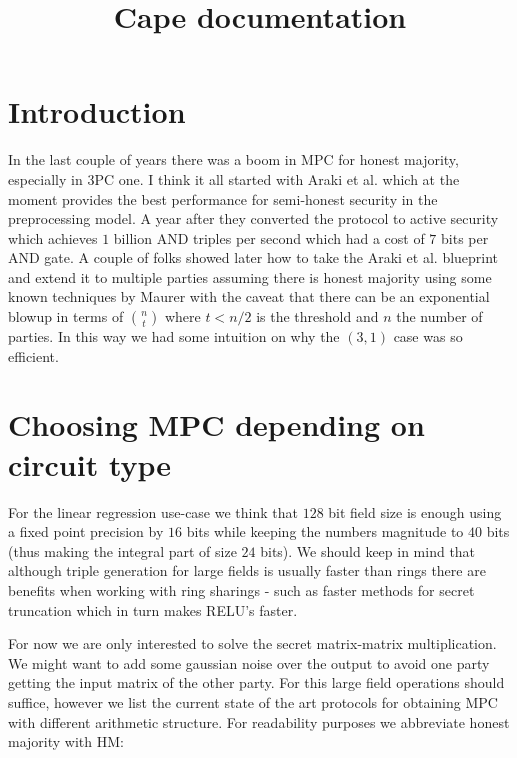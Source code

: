 \documentclass[11pt]{article}
\begin{document}
%

\title{Cape documentation}

\maketitle

\section{Introduction}


In the last couple of years there was a boom in MPC for honest majority,
especially in 3PC one. I think it all started with Araki et al.
\cite{CCS:AFLNO16} which at the moment provides the best performance for
semi-honest security in the preprocessing model. A year after they converted
the protocol to active security which achieves $1$ billion AND triples per
second \cite{SP:ABFLLN17} which had a cost of $7$ bits per AND gate. A couple
of folks showed later how to take the Araki et al. \cite{CCS:AFLNO16}
blueprint and extend it to multiple parties assuming there is honest majority
\cite{SCN:KRSW18} using some known techniques by Maurer \cite{SCN:Maurer02}
with the caveat that there can be an exponential blowup in terms of $n
\choose t$ where $t<n/2$ is the threshold and $n$ the number of parties. In
this way we had some intuition on why the $(3,1)$ case was so efficient.

\section{Choosing MPC depending on circuit type} For the linear regression use-case
we think that $128$ bit field size is enough using a fixed point precision by
$16$ bits while keeping the numbers magnitude to $40$ bits (thus making the
integral part of size $24$ bits). We should keep in mind that although triple
generation for large fields is usually faster than rings there are benefits
when working with ring sharings - such as faster methods for secret
truncation which in turn makes RELU's faster.

For now we are only interested to solve the secret matrix-matrix
multiplication. We might want to add some gaussian noise over the output to
avoid one party getting the input matrix of the other party. For this large
field operations should suffice, however we list the current state of the art
protocols for obtaining MPC with different arithmetic structure. For
readability purposes we abbreviate honest majority with HM:
\end{document}
